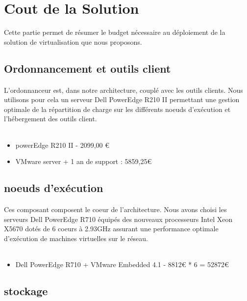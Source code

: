 \section{Cout de la Solution}

\paragraph{} Cette partie permet de résumer le budget nécessaire au déploiement de la solution de virtualisation que nous proposons. 

\subsection{Ordonnancement et outils client}

\paragraph{} L'ordonnanceur est, dans notre architecture, couplé avec les outils clients. Nous utilisons pour cela un serveur Dell PowerEdge R210 II permettant une gestion optimale de la répartition de charge sur les différents noeuds d'exécution et l'hébergement des outils client.
\\~
\begin{itemize}
	\item powerEdge R210 II - 2099,00 €
	\item VMware server + 1 an de support : 5859,25€
\end{itemize}

\subsection{noeuds d’exécution}

\paragraph{} Ces composant composent le coeur de l'architecture. Nous avons choisi les serveurs Dell PowerEdge R710 équipés des nouveaux processeurs Intel Xeon X5670 dotés de 6 coeurs à 2.93GHz assurant une performance optimale d'exécution de machines virtuelles sur le réseau.
\\~
\begin{itemize}
 	\item Dell PowerEdge R710 + VMware Embedded 4.1 - 8812€ * 6 = 52872€
\end{itemize}

\subsection{stockage}

